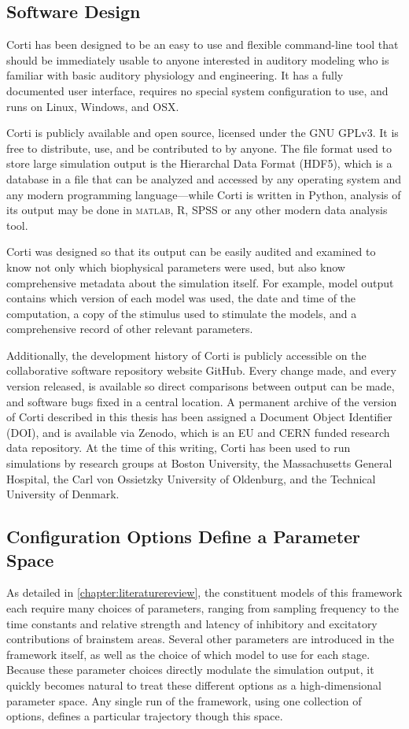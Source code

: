 \subsection{Software Design} %
\label{sub:software_design}
Corti has been designed to be an easy to use and flexible command-line tool that should be immediately usable to anyone interested in auditory modeling who is familiar with basic auditory physiology and engineering.  It has a fully documented user interface, requires no special system configuration to use, and runs on Linux, Windows, and OSX.

Corti is publicly available and open source, licensed under the GNU GPLv3.  It is free to distribute, use, and be contributed to by anyone.  The file format used to store large simulation output is the Hierarchal Data Format (HDF5), which is a database in a file that can be analyzed and accessed by any operating system and any modern programming language---while Corti is written in Python, analysis of its output may be done in \textsc{matlab}, R, SPSS or any other modern data analysis tool.

Corti was designed so that its output can be easily audited and examined to know not only which biophysical parameters were used, but also know comprehensive metadata about the simulation itself.  For example, model output contains which version of each model was used, the date and time of the computation, a copy of the stimulus used to stimulate the models, and a comprehensive record of other relevant parameters. 

Additionally, the development history of Corti is publicly accessible on the collaborative software repository website GitHub.  Every change made, and every version released, is available so direct comparisons between output can be made, and software bugs fixed in a central location.  A permanent archive of the version of Corti described in this thesis has been assigned a Document Object Identifier (DOI), and is available via Zenodo, which is an EU and CERN funded research data repository.  At the time of this writing, Corti has been used to run simulations by research groups at Boston University, the Massachusetts General Hospital, the Carl von Ossietzky University of Oldenburg, and the Technical University of Denmark.  

\subsection{Configuration Options Define a Parameter Space}
As detailed in \autoref{chapter:literaturereview}, the constituent models of this framework each require many choices of parameters, ranging from sampling frequency to the time constants and relative strength and latency of inhibitory and excitatory contributions of brainstem areas. Several other parameters are introduced in the framework itself, as well as the choice of which model to use for each stage. Because these parameter choices directly modulate the simulation output, it quickly becomes natural to treat these different options as a high-dimensional parameter space.  Any single run of the framework, using one collection of options, defines a particular trajectory though this space.

